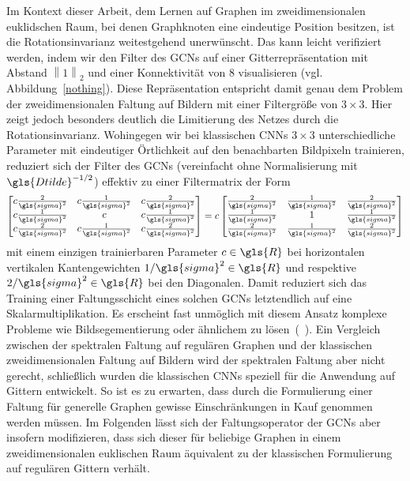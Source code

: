 Im Kontext dieser Arbeit, dem Lernen auf Graphen im zweidimensionalen euklidschen Raum, bei denen Graphknoten eine eindeutige Position besitzen, ist die Rotationsinvarianz weitestgehend unerwünscht.
Das kann leicht verifiziert werden, indem wir den Filter des \glspl{GCN} auf einer Gitterrepräsentation mit Abstand $\left\|1\right\|_2$ und einer Konnektivität von $8$ visualisieren (vgl. Abbildung~\ref{nothing}).
Diese Repräsentation entspricht damit genau dem Problem der zweidimensionalen Faltung auf Bildern mit einer Filtergröße von $3 \times 3$.
Hier zeigt jedoch besonders deutlich die Limitierung des Netzes durch die Rotationsinvarianz.
Wohingegen wir bei klassischen \glspl{CNN} $3 \times 3$ unterschiedliche Parameter mit eindeutiger Örtlichkeit auf den benachbarten Bildpixeln trainieren, reduziert sich der Filter des \glspl{GCN} (vereinfacht ohne Normalisierung mit $\gls{Dtilde}^{-1/2}$) effektiv zu einer Filtermatrix der Form
\begin{equation*}
  \begin{bmatrix}
    c \frac{2}{\gls{sigma}^2} & c \frac{1}{\gls{sigma}^2} & c \frac{2}{\gls{sigma}^2}\\
    c \frac{1}{\gls{sigma}^2} & c  & c \frac{1}{\gls{sigma}^2}\\
    c \frac{2}{\gls{sigma}^2} & c \frac{1}{\gls{sigma}^2} & c \frac{2}{\gls{sigma}^2}
  \end{bmatrix} = c \begin{bmatrix}
    \frac{2}{\gls{sigma}^2} & \frac{1}{\gls{sigma}^2} & \frac{2}{\gls{sigma}^2}\\
    \frac{1}{\gls{sigma}^2} & 1  & \frac{1}{\gls{sigma}^2}\\
    \frac{2}{\gls{sigma}^2} & \frac{1}{\gls{sigma}^2} & \frac{2}{\gls{sigma}^2}
  \end{bmatrix}
\end{equation*}
mit einem einzigen trainierbaren Parameter $c \in \gls{R}$ bei horizontalen \bzw{} vertikalen Kantengewichten $1/\gls{sigma}^2 \in \gls{R}$ und respektive $2/\gls{sigma}^2 \in \gls{R}$ bei den Diagonalen.
Damit reduziert sich das Training einer Faltungsschicht eines solchen \glspl{GCN} letztendlich auf eine Skalarmultiplikation.
Es erscheint fast unmöglich mit diesem Ansatz komplexe Probleme wie \zB{} Bildsegementierung oder ähnlichem zu lösen~(\vgl{}~\cite{gcn_review}).
Ein Vergleich zwischen der spektralen Faltung auf regulären Graphen und der klassischen zweidimensionalen Faltung auf Bildern wird der spektralen Faltung aber nicht gerecht, schließlich wurden die klassischen \glspl{CNN} speziell für die Anwendung auf Gittern entwickelt.
So ist es zu erwarten, dass durch die Formulierung einer Faltung für generelle Graphen gewisse Einschränkungen in Kauf genommen werden müssen.
Im Folgenden lässt sich der Faltungsoperator der \glspl{GCN} aber insofern modifizieren, dass sich dieser für beliebige Graphen in einem zweidimensionalen euklischen Raum äquivalent zu der klassischen Formulierung auf regulären Gittern verhält.

